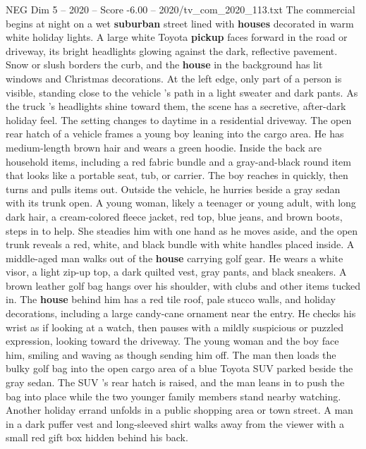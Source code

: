 \begin{textsample}{NEG Dim 5 – 2020 – Score -6.00 – 2020/tv\_com\_2020\_113.txt}  \label{ex:f5_neg_031}
The commercial begins at night on a wet \textbf{suburban} street lined with \textbf{houses} decorated in warm white holiday lights.
A large white Toyota \textbf{pickup} faces forward in the road or driveway, its bright headlights glowing against the dark, reflective pavement.
Snow or slush borders the curb, and the \textbf{house} in the background has lit windows and Christmas decorations.
At the left edge, only part of a person is visible, standing close to the vehicle ’s path in a light sweater and dark pants.
As the truck ’s headlights shine toward them, the scene has a secretive, after-dark holiday feel.
The setting changes to daytime in a residential driveway.
The open rear hatch of a vehicle frames a young boy leaning into the cargo area.
He has medium-length brown hair and wears a green hoodie.
Inside the back are household items, including a red fabric bundle and a gray-and-black round item that looks like a portable seat, tub, or carrier.
The boy reaches in quickly, then turns and pulls items out.
Outside the vehicle, he hurries beside a gray sedan with its trunk open.
A young woman, likely a teenager or young adult, with long dark hair, a cream-colored fleece jacket, red top, blue jeans, and brown boots, steps in to help.
She steadies him with one hand as he moves aside, and the open trunk reveals a red, white, and black bundle with white handles placed inside.
A middle-aged man walks out of the \textbf{house} carrying golf gear.
He wears a white visor, a light zip-up top, a dark quilted vest, gray pants, and black sneakers.
A brown leather golf bag hangs over his shoulder, with clubs and other items tucked in.
The \textbf{house} behind him has a red tile roof, pale stucco walls, and holiday decorations, including a large candy-cane ornament near the entry.
He checks his wrist as if looking at a watch, then pauses with a mildly suspicious or puzzled expression, looking toward the driveway.
The young woman and the boy face him, smiling and waving as though sending him off.
The man then loads the bulky golf bag into the open cargo area of a blue Toyota SUV parked beside the gray sedan.
The SUV ’s rear hatch is raised, and the man leans in to push the bag into place while the two younger family members stand nearby watching.
Another holiday errand unfolds in a public shopping area or town street.
A man in a dark puffer vest and long-sleeved shirt walks away from the viewer with a small red gift box hidden behind his back.

\end{textsample}
